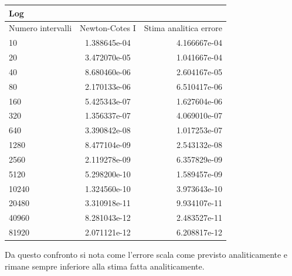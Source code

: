 \begin{center}
\begin{longtable}[h]{lcr}
\toprule
Log &  \\
\midrule
Numero intervalli & Newton-Cotes I & Stima analitica errore  \\
\midrule
10 &	  1.388645e-04  	 & 4.166667e-04 \\ 
20 &	 3.472070e-05  		 & 1.041667e-04 \\ 
40 &	 8.680460e-06  		 & 2.604167e-05 \\ 
80 &	 2.170133e-06  		 & 6.510417e-06 \\ 
160 &	 5.425343e-07  		 & 1.627604e-06 \\ 
320 &	 1.356337e-07  		 & 4.069010e-07 \\ 
640 &	  3.390842e-08  	 & 1.017253e-07 \\ 
1280 &	  8.477104e-09  	 & 2.543132e-08 \\ 
2560 &	  2.119278e-09  	 & 6.357829e-09 \\ 
5120 &	  5.298200e-10  	 & 1.589457e-09 \\ 
10240 &	  1.324560e-10  	 & 3.973643e-10 \\ 
20480 &	  3.310918e-11  	 & 9.934107e-11 \\ 
40960 &	  8.281043e-12  	 & 2.483527e-11 \\ 
81920 &	  2.071121e-12  	 & 6.208817e-12 \\ 
\end{longtable}
\end{center}

Da questo confronto si nota come l'errore scala come previsto analiticamente e rimane sempre inferiore alla stima fatta analiticamente.

